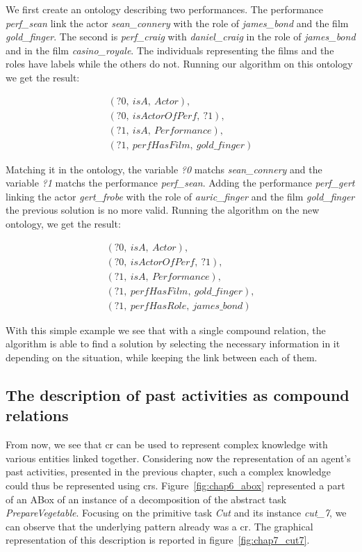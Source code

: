 We first create an ontology describing two performances. The performance \textit{perf\_sean} link the actor \textit{sean\_connery} with the role of \textit{james\_bond} and the film \textit{gold\_finger}. The second is \textit{perf\_craig} with \textit{daniel\_craig} in the role of \textit{james\_bond} and in the film \textit{casino\_royale}. The individuals representing the films and the roles have labels while the others do not. Running our algorithm on this ontology we get the result:

\begin{gather*}
(?0,\ isA,\ Actor),\\
(?0,\ isActorOfPerf,\ ?1),\\
(?1,\ isA,\ Performance),\\
(?1,\ perfHasFilm,\ gold\_finger)
\end{gather*}

Matching it in the ontology, the variable \textit{?0} matchs \textit{sean\_connery} and the variable \textit{?1} matchs the performance \textit{perf\_sean}. Adding the performance \textit{perf\_gert} linking the actor \textit{gert\_frobe} with the role of \textit{auric\_finger} and the film \textit{gold\_finger} the previous solution is no more valid. Running the algorithm on the new ontology, we get the result:

\begin{gather*}
(?0,\ isA,\ Actor),\\
(?0,\ isActorOfPerf,\ ?1),\\
(?1,\ isA,\ Performance),\\
(?1,\ perfHasFilm,\ gold\_finger),\\
(?1,\ perfHasRole,\ james\_bond)
\end{gather*}

With this simple example we see that with a single compound relation, the algorithm is able to find a solution by selecting the necessary information in it depending on the situation, while keeping the link between each of them.

\subsection{The description of past activities as compound relations}

From now, we see that \acrlong{cr} can be used to represent complex knowledge with various entities linked together. Considering now the representation of an agent's past activities, presented in the previous chapter, such a complex knowledge could thus be represented using \acrshort{cr}s. Figure~\ref{fig:chap6_abox} represented a part of an ABox of an instance of a decomposition of the abstract task \textit{PrepareVegetable}. Focusing on the primitive task \textit{Cut} and its instance \textit{cut\_7}, we can observe that the underlying pattern already was a \acrshort{cr}. The graphical representation of this description is reported in figure~\ref{fig:chap7_cut7}.

